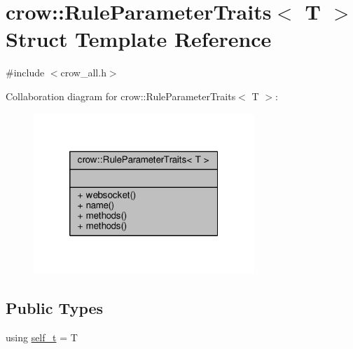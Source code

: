 \hypertarget{structcrow_1_1_rule_parameter_traits}{\section{crow\-:\-:Rule\-Parameter\-Traits$<$ T $>$ Struct Template Reference}
\label{structcrow_1_1_rule_parameter_traits}
}


{\ttfamily \#include $<$crow\-\_\-all.\-h$>$}



Collaboration diagram for crow\-:\-:Rule\-Parameter\-Traits$<$ T $>$\-:
\nopagebreak
\begin{figure}[H]
\begin{center}
\leavevmode
\includegraphics[width=236pt]{structcrow_1_1_rule_parameter_traits__coll__graph}
\end{center}
\end{figure}
\subsection*{Public Types}
\begin{DoxyCompactItemize}
\item 
using \hyperlink{structcrow_1_1_rule_parameter_traits_aa408e9880526bcb494f3600077a9cee2}{self\-\_\-t} = T
\end{DoxyCompactItemize}
